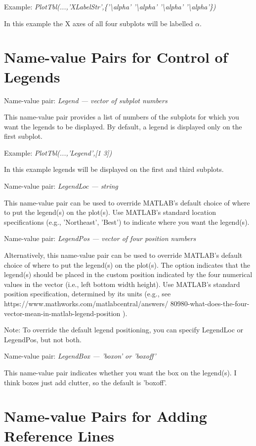 \documentclass{article}
\newcommand{\example}[1]{Example: {\it #1}}
\newcommand{\namevalue}[2]{{\it #1 --- #2}}
\begin{document}
\example{PlotTbl(...,'XLabelStr',\{'\textbackslash alpha' '\textbackslash alpha' '\textbackslash alpha' '\textbackslash alpha'\})}

In this example the X axes of all four subplots will be labelled $\alpha$.

\section{Name-value Pairs for Control of Legends}

Name-value pair: \namevalue{Legend}{vector of subplot numbers}

This name-value pair provides a list of numbers of the subplots for which you want the legends to be displayed.
By default, a legend is displayed only on the first subplot.

\example{PlotTbl(...,'Legend',[1 3])}

In this example legends will be displayed on the first and third subplots.

Name-value pair: \namevalue{LegendLoc}{string}

This name-value pair can be used to override MATLAB's default choice of where to
put the legend(s) on the plot(s).
Use MATLAB's standard location specifications (e.g., 'Northeast', 'Best')
to indicate where you want the legend(s).

Name-value pair: \namevalue{LegendPos}{vector of four position numbers}

Alternatively, this name-value pair can be used to override MATLAB's default choice of where to
put the legend(s) on the plot(s).
The option indicates that the legend(s) should be placed in the custom position
indicated by the four numerical values in the vector (i.e., left bottom width height).
Use MATLAB's standard position specification, determined by its units
(e.g., see https://www.mathworks.com/matlabcentral/answers/ 80980-what-does-the-four-vector-mean-in-matlab-legend-position ).

Note: To override the default legend positioning, you can specify LegendLoc or LegendPos, but not both.

Name-value pair: \namevalue{LegendBox}{'boxon' or 'boxoff'}

This name-value pair indicates whether you want the box on the legend(s).
I think boxes just add clutter, so the default is 'boxoff'.

\section{Name-value Pairs for Adding Reference Lines}  %
\end{document}
